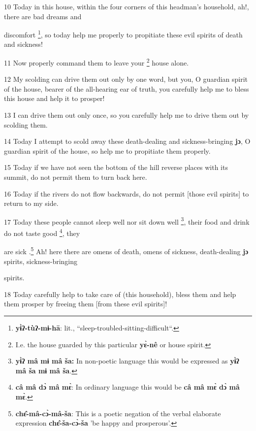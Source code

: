 10 Today in this house, within the four corners of this headman's household, ah!,
there are bad dreams and

discomfort \footnote{\textbf{ yɨ̀ʔ-tùʔ-mɨ-hā}: lit., ``sleep-troubled-sitting-difficult``.}, so today help me properly to propitiate these evil spirits of death
and sickness!

11 Now properly command them to leave your \footnote{I.e. the house guarded by this particular \textbf{yɛ̀-nê }or house spirit.} house alone.

12 My scolding can drive them out only by one word, but you, O  guardian spirit
of the house, bearer of the all-hearing ear of truth, you carefully help me to
bless this house and help it to prosper!

13 I can drive them out  only once, so you carefully help me to drive them out
by scolding them.

14 Today I attempt to scold away these death-dealing and\textbf{ }sickness-bringing\textbf{
jɔ}, O guardian spirit of the house, so help me to propitiate them properly.

15 Today if we have not seen the bottom of the hill reverse places with its summit,
do not permit them to turn back here.

16 Today if the rivers do not flow backwards, do not permit [those evil spirits]
to return to my side.

17 Today these people cannot sleep well nor sit down well \footnote{\textbf{yɨ̀ʔ mâ mɨ mâ ša:}  In non-poetic language this would be expressed as \textbf{yɨ̀ʔ mâ ša mɨ mâ ša}.},  their food and
drink do not taste good \footnote{\textbf{câ mâ dɔ̀ mâ mɛ̀}: In ordinary language this would be \textbf{câ mâ mɛ̀ dɔ̀ mâ mɛ̀}.}, they

are sick .\footnote{\textbf{ chɛ̂-mâ-cɔ̀-mâ-ša}: This is a poetic negation of the verbal elaborate expression \textbf{chɛ̂-ša-cɔ̀-ša} 'be happy and prosperous'.} Ah! here there are omens of death, omens of sickness, death-dealing
\textbf{jɔ} spirits, sickness-bringing

spirits.

18 Today carefully help to take care of (this household), bless them and help them
prosper by freeing them [from these evil spirits]!

